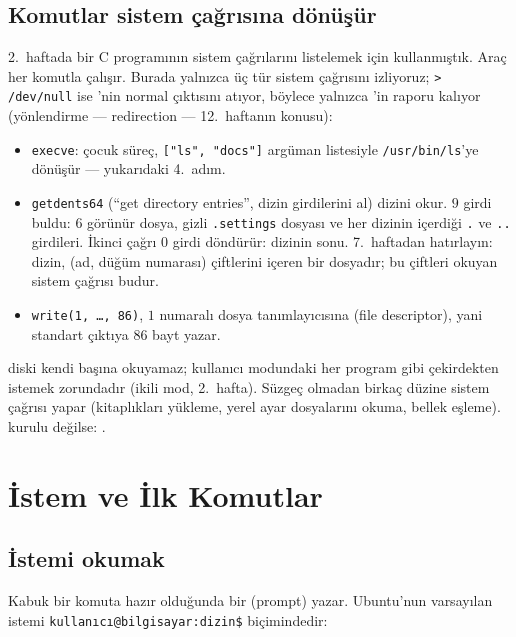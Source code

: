 \subsection{Komutlar sistem çağrısına dönüşür}

2.\ haftada bir C programının sistem çağrılarını listelemek için  kullanmıştık. Araç her komutla çalışır. Burada yalnızca üç tür sistem çağrısını izliyoruz; \texttt{> /dev/null} ise 'nin normal çıktısını atıyor, böylece yalnızca 'in raporu kalıyor (yönlendirme --- redirection --- 12.\ haftanın konusu):


\begin{itemize}
  \item \texttt{execve}: çocuk süreç, \texttt{["ls", "docs"]} argüman listesiyle \texttt{/usr/bin/ls}'ye dönüşür --- yukarıdaki 4.\ adım.
  \item \texttt{getdents64} (``get directory entries'', dizin girdilerini al) dizini okur. $9$ girdi buldu: $6$ görünür dosya, gizli \texttt{.settings} dosyası ve her dizinin içerdiği \texttt{.} ve \texttt{..} girdileri. İkinci çağrı $0$ girdi döndürür: dizinin sonu. 7.\ haftadan hatırlayın: dizin, (ad, düğüm numarası) çiftlerini içeren bir dosyadır; bu çiftleri okuyan sistem çağrısı budur.
  \item \texttt{write(1, \ldots, 86)}, $1$ numaralı dosya tanımlayıcısına (file descriptor), yani standart çıktıya $86$ bayt yazar.
\end{itemize}
 diski kendi başına okuyamaz; kullanıcı modundaki her program gibi çekirdekten istemek zorundadır (ikili mod, 2.\ hafta). Süzgeç olmadan  birkaç düzine sistem çağrısı yapar (kitaplıkları yükleme, yerel ayar dosyalarını okuma, bellek eşleme).  kurulu değilse: .

\section{İstem ve İlk Komutlar}

\subsection{İstemi okumak}

Kabuk bir komuta hazır olduğunda bir  (prompt) yazar. Ubuntu'nun varsayılan istemi \texttt{kullanıcı@bilgisayar:dizin\$} biçimindedir:

